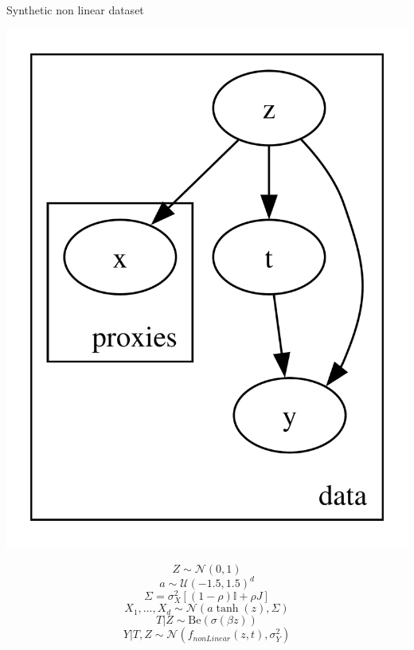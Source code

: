 \documentclass[10pt]{beamer}
\begin{document}
\begin{frame}{Synthetic non linear dataset}
    \begin{minipage}{0.48\textwidth}
    \includegraphics[width=\textwidth]{images/pyro_model.pdf}
    \end{minipage}
    \begin{minipage}{0.48\textwidth}
    \begin{equation*}
        Z \sim \mathcal{N}(0,1)
        \end{equation*}
        \begin{equation*}
            a \sim \mathcal{U}(-1.5,1.5)^d
        \end{equation*}
        \begin{equation*}
        \Sigma=\sigma_X^2[(1-\rho) \mathbb{I}+\rho J]    
        \end{equation*}
        \begin{equation*}
        X_1,...,X_d \sim \mathcal{N}(a\tanh(z),\Sigma)     
        \end{equation*}
        \begin{equation*}
        T | Z \sim \text{Be}(\sigma(\beta z))    
        \end{equation*}
\small{        \begin{equation*}
        Y|T,Z \sim \mathcal{N}\left(f_{nonLinear}(z,t),\sigma_Y^2\right)           
        \end{equation*}}
    \end{minipage}
    
\end{frame}
\end{document}
